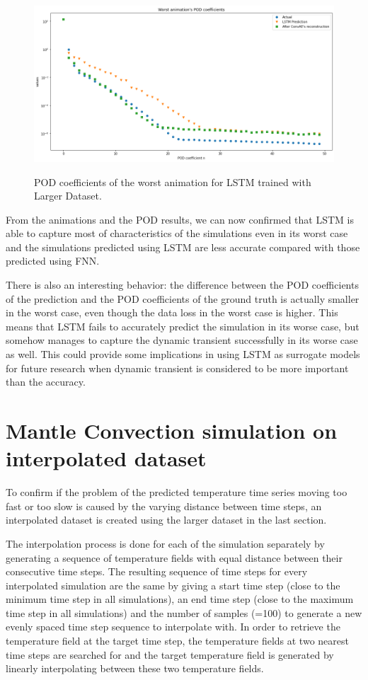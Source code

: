 \begin{figure}[H]
    \centering
    \caption{POD coefficients of the worst animation for LSTM trained with Larger Dataset.}
    \includegraphics[scale=0.4]{figures/mantle_convection_images/larger_dataset/LSTM_Worst_POD.png}
    \label{figure:LSTM_larger_worst_POD}
\end{figure}

From the animations and the POD results, we can now confirmed that LSTM is able to capture most of characteristics of the simulations even in its worst case and the simulations predicted using LSTM are less accurate compared with those predicted using FNN. 

There is also an interesting behavior: the difference between the POD coefficients of the prediction and the POD coefficients of the ground truth is actually smaller in the worst case, even though the data loss in the worst case is higher. This means that LSTM fails to accurately predict the simulation in its worse case, but somehow manages to capture the dynamic transient successfully in its worse case as well. This could provide some implications in using LSTM as surrogate models for future research when dynamic transient is considered to be more important than the accuracy.


\section{Mantle Convection simulation on interpolated dataset}
\label{sec:mc_interpolated}

To confirm if the problem of the predicted temperature time series moving too fast or too slow is caused by the varying distance between time steps, an interpolated dataset is created using the larger dataset in the last section.

The interpolation process is done for each of the simulation separately by generating a sequence of temperature fields with equal distance between their consecutive time steps. The resulting sequence of time steps for every interpolated simulation are the same by giving a start time step (close to the minimum time step in all simulations), an end time step (close to the maximum time step in all simulations) and the number of samples (=100) to generate a new evenly spaced time step sequence to interpolate with. In order to retrieve the temperature field at the target time step, the temperature fields at two nearest time steps are searched for and the target temperature field is generated by linearly interpolating between these two temperature fields.

